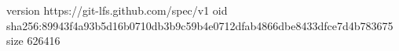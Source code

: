 version https://git-lfs.github.com/spec/v1
oid sha256:89943f4a93b5d16b0710db3b9c59b4e0712dfab4866dbe8433dfce7d4b783675
size 626416
